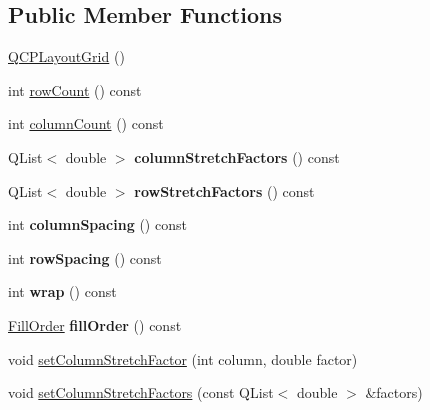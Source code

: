 \subsection*{Public Member Functions}
\begin{DoxyCompactItemize}
\item 
\hyperlink{class_q_c_p_layout_grid_ab2a4c1587dc8aed4c41c509c8d8d2a64}{Q\+C\+P\+Layout\+Grid} ()
\item 
int \hyperlink{class_q_c_p_layout_grid_a19c66fd76cbce58a8e94f33797e0c0aa}{row\+Count} () const
\item 
int \hyperlink{class_q_c_p_layout_grid_a1a2962cbf45011405b64b913afa8e7a2}{column\+Count} () const
\item 
\mbox{\label{class_q_c_p_layout_grid_a8e0e587c386bbcd1b94119f5f44c512d}} 
Q\+List$<$ double $>$ {\bfseries column\+Stretch\+Factors} () const
\item 
\mbox{\label{class_q_c_p_layout_grid_aa33408586427e77e05f79defde7f3568}} 
Q\+List$<$ double $>$ {\bfseries row\+Stretch\+Factors} () const
\item 
\mbox{\label{class_q_c_p_layout_grid_adcf4c387d5996bf6e4ae0ed26138247e}} 
int {\bfseries column\+Spacing} () const
\item 
\mbox{\label{class_q_c_p_layout_grid_a4cb6c680505cd0ce6f85b9e217fd2cd0}} 
int {\bfseries row\+Spacing} () const
\item 
\mbox{\label{class_q_c_p_layout_grid_a8bb71b52b2796c9f05fae6a32d2d0efd}} 
int {\bfseries wrap} () const
\item 
\mbox{\label{class_q_c_p_layout_grid_a6cb6563a13759222ad92ae397bd6c27e}} 
\hyperlink{class_q_c_p_layout_grid_a7d49ee08773de6b2fd246edfed353cca}{Fill\+Order} {\bfseries fill\+Order} () const
\item 
void \hyperlink{class_q_c_p_layout_grid_ae38f31a71687b9d7ee3104852528fb50}{set\+Column\+Stretch\+Factor} (int column, double factor)
\item 
void \hyperlink{class_q_c_p_layout_grid_a6c2591d1a7e2534ce036989543b49e57}{set\+Column\+Stretch\+Factors} (const Q\+List$<$ double $>$ \&factors)
\item 

\end{DoxyCompactItemize}
